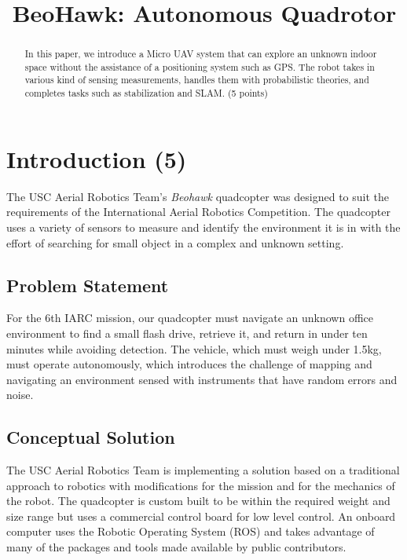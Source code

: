 \documentclass[12pt, letterpaper]{article}
\title{BeoHawk: Autonomous Quadrotor}
\begin{document}
\maketitle
\begin{people}
\end{people}

\begin{abstract}
	In this paper, we introduce a Micro UAV system that can explore an unknown indoor space without the assistance of a positioning system such as GPS. The robot takes in various kind of sensing measurements, handles them with probabilistic theories, and completes tasks such as stabilization and SLAM.  (5 points)
\end{abstract}

\section{Introduction (5)}
The USC Aerial Robotics Team's \textit{Beohawk} quadcopter was designed to suit the requirements of the International Aerial Robotics Competition. The quadcopter uses a variety of sensors to measure and identify the environment it is in with the effort of searching for small object in a complex and unknown setting.

\subsection{Problem Statement}
For the 6th IARC mission, our quadcopter must navigate an unknown office environment to find a small flash drive, retrieve it, and return in under ten minutes while avoiding detection.  The vehicle, which must weigh under 1.5kg, must operate autonomously, which introduces the challenge of mapping and navigating an environment sensed with instruments that have random errors and noise. 

\subsection{Conceptual Solution}
The USC Aerial Robotics Team is implementing a solution based on a traditional approach to robotics with modifications for the mission and for the mechanics of the robot. The quadcopter is custom built to be within the required weight and size range but uses a commercial control board for low level control. An onboard computer uses the Robotic Operating System (ROS) and takes advantage of many of the packages and tools made available by public contributors. 
\end{document}
